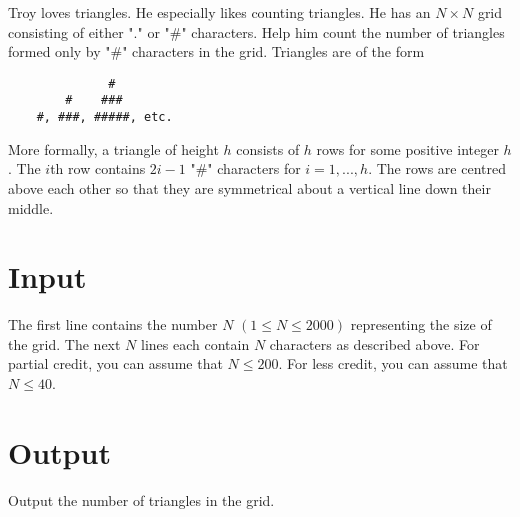 Troy loves triangles. He especially likes counting triangles. He has an $N \times N$ grid consisting
of either "." or "\#" characters. Help him count the number of triangles formed only by "\#"
characters in the grid. Triangles are of the form
\begin{verbatim}
              #
        #    ###
    #, ###, #####, etc.
\end{verbatim}

More formally, a triangle of height $h$ consists of $h$ rows for some positive integer $h$. The $i$th row contains $2i-1$ "\#" characters for $i = 1,...,h$. The rows are centred above each other so that they are symmetrical about a vertical line down their middle.


\section*{Input}
The first line contains the number $N$ $(1 \leq N \leq 2000)$ representing the size of the grid. The
next $N$ lines each contain $N$ characters as described above. For partial credit, you can assume that
$N \leq 200$. For less credit, you can assume that $N \leq 40$.

\section*{Output}
Output the number of triangles in the grid.
